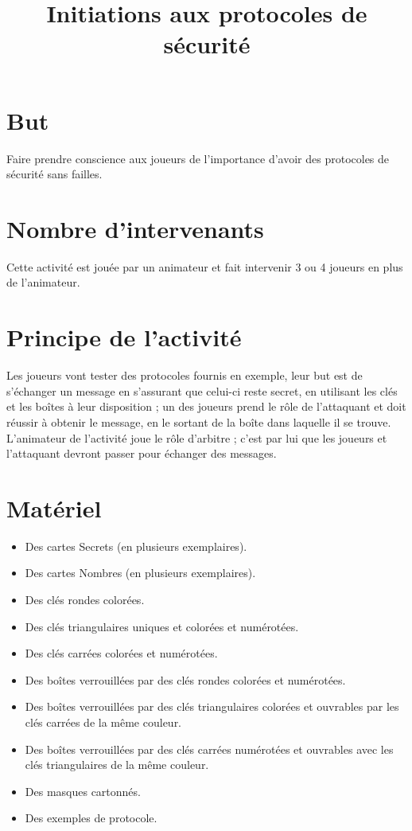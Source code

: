 \documentclass[a4paper,10pt]{article}
\title{Initiations aux protocoles de sécurité}
\begin{document}
\maketitle


\section{But}
Faire prendre conscience aux joueurs de l'importance d'avoir des protocoles de sécurité sans failles.

\section{Nombre d'intervenants}
Cette activité est jouée par un animateur et fait intervenir 3 ou 4 joueurs en plus de l'animateur.

\section{Principe de l'activité}
Les joueurs vont tester des protocoles fournis en exemple, leur but est de s'échanger un message en s'assurant que celui-ci reste secret, en utilisant les clés et les boîtes à leur disposition ; un des joueurs prend le rôle de l'attaquant et doit réussir à obtenir le message, en le sortant de la boîte dans laquelle il se trouve. L'animateur de l'activité joue le rôle d'arbitre ; c'est par lui que les joueurs et l'attaquant devront passer pour échanger des messages.

\section{Matériel}
\begin{itemize}
\item Des cartes Secrets (en plusieurs exemplaires).
\item Des cartes Nombres (en plusieurs exemplaires).
\item Des clés rondes colorées.
\item Des clés triangulaires uniques et colorées et numérotées.
\item Des clés carrées colorées et numérotées.
\item Des boîtes verrouillées par des clés rondes colorées et numérotées.
\item Des boîtes verrouillées par des clés triangulaires colorées et ouvrables par les clés carrées de la même couleur.
\item Des boîtes verrouillées par des clés carrées numérotées et ouvrables avec les clés triangulaires de la même couleur.
\item Des masques cartonnés.
\item Des exemples de protocole.
\end{itemize}
\end{document}
